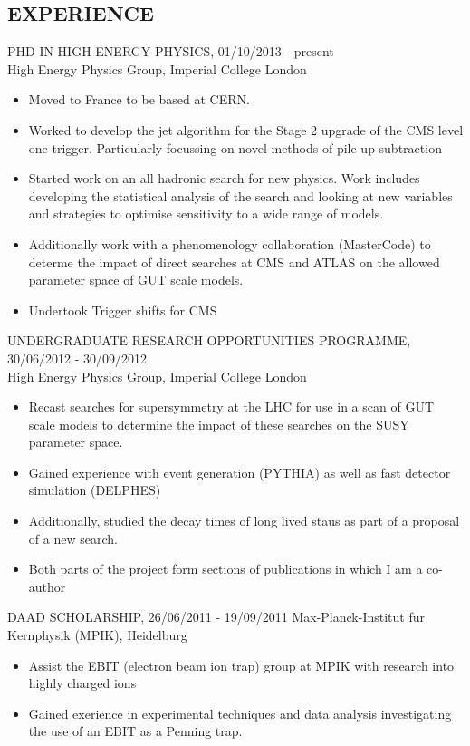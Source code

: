\documentclass[9pt]{res} %
\begin{document}
\begin{resume}
\section{EXPERIENCE} 
\vspace{0.2cm}
PHD IN HIGH ENERGY PHYSICS, 01/10/2013 - present \\
\vspace{0.1cm}
High Energy Physics Group, Imperial College London 
   \begin{itemize} \itemsep -2pt  %
   \item Moved to France to be based at CERN. 
   \item Worked to develop the jet algorithm for the Stage 2 upgrade of the CMS level one trigger. Particularly focussing on novel methods of pile-up subtraction
   \item Started work on an all hadronic search for new physics. Work includes developing the statistical analysis of the search and looking at new variables and strategies to optimise sensitivity to a wide range of models.
   \item Additionally work with a phenomenology collaboration (MasterCode) to determe the impact of direct searches at CMS and ATLAS on the allowed parameter space of GUT scale models.
   \item Undertook Trigger shifts for CMS
 \end{itemize}

UNDERGRADUATE RESEARCH OPPORTUNITIES PROGRAMME, 30/06/2012 - 30/09/2012 \\
\vspace{0.1cm}
High Energy Physics Group, Imperial College London 
   \begin{itemize} \itemsep -2pt  %
   \item Recast searches for supersymmetry at the LHC for use in a scan of GUT scale models to determine the impact of these searches on the SUSY parameter space.
   \item Gained experience with event generation (PYTHIA) as well as fast detector simulation (DELPHES)
   \item Additionally, studied the decay times of long lived staus as part of a proposal of a new search.
   \item Both parts of the project form sections of publications in which I am a co-author
 \end{itemize}

DAAD SCHOLARSHIP, 26/06/2011 - 19/09/2011
\vspace{0.1cm}
Max-Planck-Institut fur Kernphysik (MPIK), Heidelburg
   \begin{itemize}\itemsep -2pt  %
   \item Assist the EBIT (electron beam ion trap) group at MPIK with research into highly charged ions
   \item Gained exerience in experimental techniques and data analysis investigating the use of an EBIT as a Penning trap.
   \end{itemize}


\end{resume}
\end{document}
